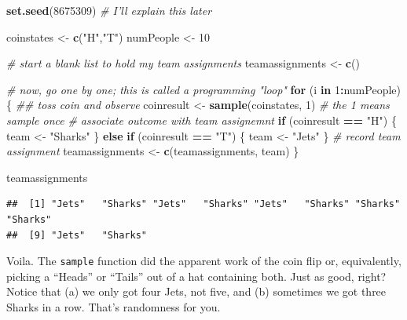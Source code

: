 \documentclass[openany]{book}
\newenvironment{Shaded}{\begin{snugshade}}{\end{snugshade}}
\newcommand{\CommentTok}[1]{\textcolor[rgb]{0.56,0.35,0.01}{\textit{#1}}}
\newcommand{\ControlFlowTok}[1]{\textcolor[rgb]{0.13,0.29,0.53}{\textbf{#1}}}
\newcommand{\DecValTok}[1]{\textcolor[rgb]{0.00,0.00,0.81}{#1}}
\newcommand{\KeywordTok}[1]{\textcolor[rgb]{0.13,0.29,0.53}{\textbf{#1}}}
\newcommand{\NormalTok}[1]{#1}
\newcommand{\OperatorTok}[1]{\textcolor[rgb]{0.81,0.36,0.00}{\textbf{#1}}}
\newcommand{\StringTok}[1]{\textcolor[rgb]{0.31,0.60,0.02}{#1}}
\begin{document}
\begin{Shaded}
\begin{Highlighting}[]
\KeywordTok{set.seed}\NormalTok{(}\DecValTok{8675309}\NormalTok{) }\CommentTok{# I'll explain this later }

\NormalTok{coinstates <-}\StringTok{ }\KeywordTok{c}\NormalTok{(}\StringTok{"H"}\NormalTok{,}\StringTok{"T"}\NormalTok{)}
\NormalTok{numPeople <-}\StringTok{ }\DecValTok{10}

\CommentTok{# start a blank list to hold my team assignments}
\NormalTok{teamassignments <-}\StringTok{ }\KeywordTok{c}\NormalTok{()}

\CommentTok{# now, go one by one; this is called a programming "loop"}
\ControlFlowTok{for}\NormalTok{ (i }\ControlFlowTok{in} \DecValTok{1}\OperatorTok{:}\NormalTok{numPeople) \{}
  \CommentTok{## toss coin and observe}
\NormalTok{  coinresult <-}\StringTok{ }\KeywordTok{sample}\NormalTok{(coinstates, }\DecValTok{1}\NormalTok{) }\CommentTok{# the 1 means sample once}
  \CommentTok{# associate outcome with team assignemnt}
  \ControlFlowTok{if}\NormalTok{ (coinresult }\OperatorTok{==}\StringTok{ "H"}\NormalTok{) \{}
\NormalTok{    team <-}\StringTok{ "Sharks"}
\NormalTok{  \} }\ControlFlowTok{else} \ControlFlowTok{if}\NormalTok{ (coinresult }\OperatorTok{==}\StringTok{ "T"}\NormalTok{) \{}
\NormalTok{    team <-}\StringTok{ "Jets"}
\NormalTok{  \}}
  \CommentTok{# record team assignment}
\NormalTok{  teamassignments <-}\StringTok{ }\KeywordTok{c}\NormalTok{(teamassignments, team)}
\NormalTok{\}}

\NormalTok{teamassignments}
\end{Highlighting}
\end{Shaded}

\begin{verbatim}
##  [1] "Jets"   "Sharks" "Jets"   "Sharks" "Jets"   "Sharks" "Sharks" "Sharks"
##  [9] "Jets"   "Sharks"
\end{verbatim}

Voila. The \texttt{sample} function did the apparent work of the coin flip or, equivalently, picking a ``Heads'' or ``Tails'' out of a hat containing both. Just as good, right? Notice that (a) we only got four Jets, not five, and (b) sometimes we got three Sharks in a row. That's randomness for you.
\end{document}
